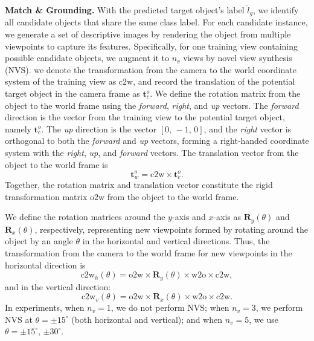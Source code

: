 \textbf{Match \& Grounding.} With the predicted target object's label $\hat{l}_g$, we identify all candidate objects that share the same class label. For each candidate instance, we generate a set of descriptive images by rendering the object from multiple viewpoints to capture its features. Specifically, for one training view containing possible candidate objects, we augment it to $n_v$ views by novel view synthesis (NVS). we denote the transformation from the camera to the world coordinate system of the training view as $\text{c2w}$, and record the translation of the potential target object in the camera frame as $\mathbf{t}^{o}_{c}$. We define the rotation matrix from the object to the world frame using the \textit{forward}, \textit{right}, and \textit{up} vectors. The \textit{forward} direction is the vector from the training view to the potential target object, namely $\mathbf{t}^{o}_{c}$. The \textit{up} direction is the vector $[0,\,-1,\,0]$, and the \textit{right} vector is orthogonal to both the \textit{forward} and \textit{up} vectors, forming a right-handed coordinate system with the \textit{right}, \textit{up}, and \textit{forward} vectors. The translation vector from the object to the world frame is
    \begin{equation}
        \mathbf{t}^{o}_{w} = \text{c2w} \times \mathbf{t}^{o}_{c}.
        \label{equ:NVS0}
\end{equation}
Together, the rotation matrix and translation vector constitute the rigid transformation matrix $\text{o2w}$ from the object to the world frame.


We define the rotation matrices around the $y$-axis and $x$-axis as $\mathbf{R}_y(\theta)$ and $\mathbf{R}_x(\theta)$, respectively, representing new viewpoints formed by rotating around the object by an angle $\theta$ in the horizontal and vertical directions. Thus, the transformation from the camera to the world frame for new viewpoints in the horizontal direction is
\begin{equation}
    \text{c2w}_h(\theta) = \text{o2w} \times \mathbf{R}_y(\theta) \times \text{w2o} \times \text{c2w},
    \label{equ:NVS1}
\end{equation}
and in the vertical direction:
\begin{equation}
    \text{c2w}_v(\theta) = \text{o2w} \times \mathbf{R}_x(\theta) \times \text{w2o} \times \text{c2w}.
    \label{equ:NVS2}
\end{equation}
In experiments, when $n_v=1$, we do not perform NVS; when $n_v=3$, we perform NVS at $\theta = \pm15^\circ$ (both horizontal and vertical); and when $n_v=5$, we use $\theta = \pm15^\circ$, $\pm30^\circ$.


